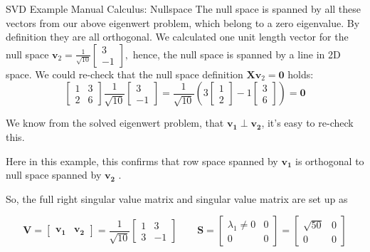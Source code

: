 \documentclass[mathserif, aspectratio=1610]{intbeamer}
\begin{document}
\begin{frame}[t]{SVD Example Manual Calculus: Nullspace}
The null space is spanned by all these vectors from our above eigenwert problem,
which belong to a zero eigenvalue. By definition they are all orthogonal.
We calculated one unit length vector for the null space
$
\bm{v}_2 =
\frac{1}{\sqrt{10}}
\begin{bmatrix}
3 \\-1
\end{bmatrix},
$
hence, the null space is spanned by a line in 2D space.
We could re-check that the null space definition $\bm{X} \bm{v}_2 = \bm{0}$ holds:
$$
\begin{bmatrix}
1 & 3\\
2 & 6
\end{bmatrix}
\frac{1}{\sqrt{10}}
\begin{bmatrix}
3 \\-1
\end{bmatrix}
=\frac{1}{\sqrt{10}}
(3\begin{bmatrix}
1 \\
2
\end{bmatrix}
-1
\begin{bmatrix}
 3\\
 6
\end{bmatrix})=\bm{0}
$$

We know from the solved eigenwert problem, that $\bm{v_1} \perp \bm{v_2}$, it's easy to re-check this.

Here in this example, this confirms that row space spanned by $\bm{v_1}$ is orthogonal to null space spanned by $\bm{v_2}$ .

So, the full right singular value matrix and singular value matrix  are set up as

$$
\bm{V} =
\begin{bmatrix}
\bm{v_1} & \bm{v_2}
\end{bmatrix}
=\frac{1}{\sqrt{10}}
\begin{bmatrix}
1 & 3 \\
3 & -1
\end{bmatrix}
\qquad
\bm{S}=
\begin{bmatrix}
\lambda_1 \neq 0 & 0\\
0 & 0
\end{bmatrix}
=
\begin{bmatrix}
\sqrt{50} & 0\\
0 & 0
\end{bmatrix}
$$
\end{frame}
\end{document}
